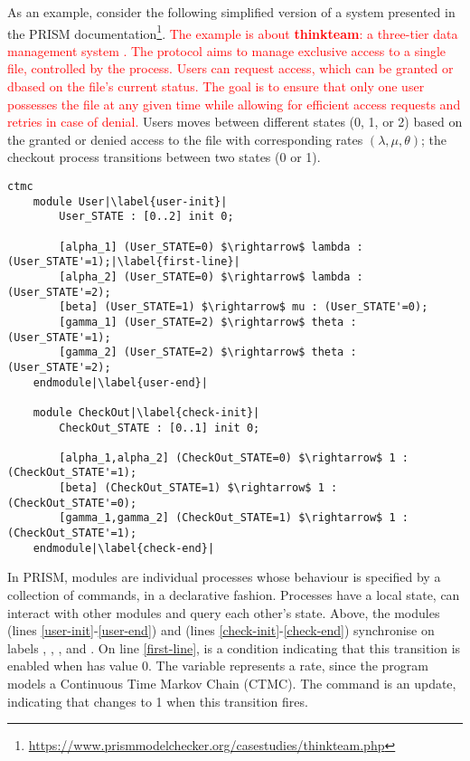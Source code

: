 As an example, consider the following simplified version of a system
presented in the PRISM
documentation\footnote{\url{https://www.prismmodelchecker.org/casestudies/thinkteam.php}}.
\textcolor{red}{The example is about \textbf{thinkteam}: a three-tier data management system \cite{DBLP:journals/entcs/BeekMLGFS05}.
The protocol aims to manage exclusive access to a single file, controlled by the  process. Users can request access, which can be granted or dbased on the file's current status. The goal is to ensure that only one user possesses the file at any 
given time while allowing for efficient access requests and retries in case of denial.}
Users moves between different states (0, 1, or 2) based on
the granted or denied access to the file with corresponding rates
$(\lambda, \mu, \theta)$; the checkout process transitions
between two states (0 or 1).
%
\begin{lstlisting}[style=prism-color,% caption={A PRISM example},captionpos=b,
  frame=none,label={example1},escapechar=|]
	ctmc 
	module User|\label{user-init}|
		User_STATE : [0..2] init 0;
	
		[alpha_1] (User_STATE=0) $\rightarrow$ lambda : (User_STATE'=1);|\label{first-line}|
		[alpha_2] (User_STATE=0) $\rightarrow$ lambda : (User_STATE'=2);
		[beta] (User_STATE=1) $\rightarrow$ mu : (User_STATE'=0);
		[gamma_1] (User_STATE=2) $\rightarrow$ theta : (User_STATE'=1);
		[gamma_2] (User_STATE=2) $\rightarrow$ theta : (User_STATE'=2);
	endmodule|\label{user-end}|
	
	module CheckOut|\label{check-init}|
		CheckOut_STATE : [0..1] init 0;
	
		[alpha_1,alpha_2] (CheckOut_STATE=0) $\rightarrow$ 1 : (CheckOut_STATE'=1);
		[beta] (CheckOut_STATE=1) $\rightarrow$ 1 : (CheckOut_STATE'=0);
		[gamma_1,gamma_2] (CheckOut_STATE=1) $\rightarrow$ 1 : (CheckOut_STATE'=1);
	endmodule|\label{check-end}|
\end{lstlisting}
%
In PRISM, modules are individual processes whose behaviour is
specified by a collection of commands, in a declarative fashion.
Processes have a local state, can interact with other modules and
query each other's state. Above, the modules  (lines
\ref{user-init}-\ref{user-end}) and  (lines
\ref{check-init}-\ref{check-end}) synchronise on labels
, , ,
 and . On line \ref{first-line},
 is a condition indicating that this
transition is enabled when  has value 0. The
variable  represents a rate, since the program
models a Continuous Time Markov Chain (CTMC). The command
 is an update, indicating that
 changes to 1 when this transition fires.

